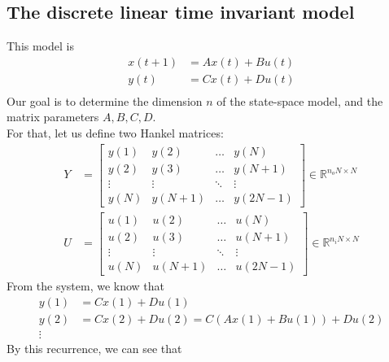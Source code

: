 \documentclass[12pt, openany]{report}
\newcommand{\R}{\mathbb{R}}
\theoremstyle{definition}
\begin{document}
\subsection{The discrete linear time invariant model}
This model is 
\begin{equation}
	\begin{aligned}
		x(t+1) &= Ax(t) +Bu(t)\\
		y(t) &= Cx(t)+Du(t)\\
	\end{aligned}
\end{equation}
Our goal is to determine the dimension $n$ of the state-space model, and the matrix parameters $A,B,C,D$.\\
For that, let us define two Hankel matrices: 
\begin{equation}
	\begin{aligned}	
		Y &= \begin{bmatrix}
			y(1) & y(2) & \dots & y(N)\\
			y(2) & y(3) & \dots & y(N+1)\\
			\vdots & \vdots & \ddots & \vdots \\
			y(N) & y(N+1) & \dots & y(2N-1)
		\end{bmatrix} \in \R^{n_oN\times N} \\ U &= \begin{bmatrix}
			u(1) & u(2) & \dots & u(N)\\
			u(2) & u(3) & \dots & u(N+1)\\
			\vdots & \vdots & \ddots & \vdots \\
			u(N) & u(N+1) & \dots & u(2N-1)
		\end{bmatrix} \in \R^{n_iN\times N}
	\end{aligned}
\end{equation}
From the system, we know that 
\begin{equation}
	\begin{aligned}
		y(1) &= Cx(1) + Du(1)\\
		y(2) &= Cx(2) + Du(2) = C(Ax(1) + Bu(1)) + Du(2)\\
		\vdots
	\end{aligned}
\end{equation}
By this recurrence, we can see that 
\end{document}
